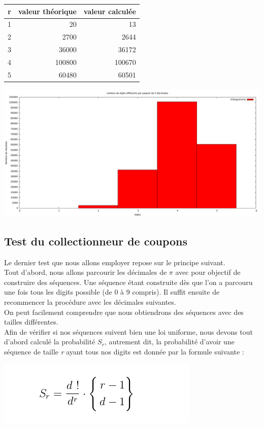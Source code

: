 \documentclass[french]{article}
\begin{document}
\centering
	\begin{tabular}{|r|r|r|}
		\hline
		r & valeur théorique & valeur calculée\\
		\hline
		1 & 20 & 13\\
		2 & 2700 & 2644\\
		3 & 36000 & 36172\\
		4 & 100800 & 100670\\
		5 & 60480 & 60501\\
		\hline
	\end{tabular}


	\begin{center}
		\includegraphics[scale=0.30]{Archives/Images/histo_poker}
	\end{center}


\subsection{Test du collectionneur de coupons}
Le dernier test que nous allons employer repose sur le principe suivant. 
\\
Tout d'abord, nous allons parcourir les décimales de $\pi$ avec pour objectif de construire des séquences.
Une séquence étant construite dès que l'on a parcouru une fois tous les digits possible (de 0 à 9 compris).
Il suffit ensuite de recommencer la procédure avec les décimales suivantes.
\\
On peut facilement comprendre que nous obtiendrons des séquences avec des tailles différentes.
\\

Afin de vérifier si nos séquences suivent bien une loi uniforme, nous devons tout d'abord calculé la probabilité $S_{r}$, autrement dit, la probabilité d'avoir une séquence de taille \textit{r} ayant tous nos digits est donnée par la formule suivante :

	\begin{center}
		\includegraphics[scale=0.40]{Archives/Images/coupons}
	\end{center}
\end{document}
